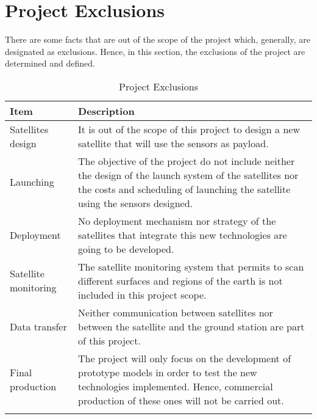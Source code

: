 \section{Project Exclusions}

There are some facts that are out of the scope of the project which, generally, are designated as exclusions. Hence, in this section, the exclusions of the project are determined and defined. 

\begin{longtable}[H]{lp{11cm}}
	
	\toprule[2pt]
	
	\textbf{Item} & \textbf{Description} \\ 
	
	\midrule[1.5pt] 
	\endhead
	
	
		Satellites design & It is out of the scope of this project to design a new satellite that will use the sensors as payload. \vspace{0.2cm}
	\\ \midrule
	
	Launching  & The objective of the project do not include neither the design of the launch system of the satellites nor the costs and scheduling of launching the satellite using the sensors designed.  \vspace{0.2cm}
	\\ \midrule
	
	Deployment & No deployment mechanism nor strategy of the satellites that integrate this new technologies are going to be developed. \vspace{0.2cm}
	\\ \midrule
	
	Satellite monitoring & The satellite monitoring system that permits to scan different surfaces and regions of the earth is not included in this project scope. \vspace{0.2cm}
	\\ \midrule
	
	Data transfer & Neither communication between satellites nor between the satellite and the ground station are part of this project. \vspace{0.2cm}
		\\ \midrule
		
	Final production & The project will only focus on the development of prototype models in order to test the new technologies implemented. Hence, commercial production of these ones will not be carried out. \vspace{0.2cm}

	\\ \bottomrule[2pt]
	
	\caption{Project Exclusions}

\end{longtable}


